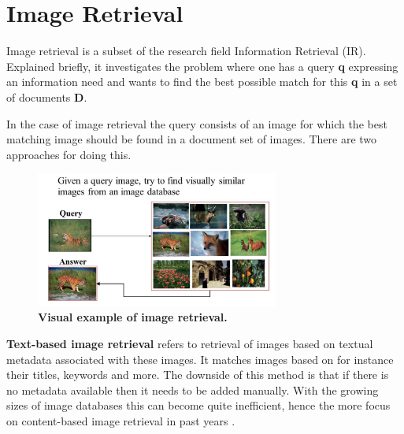 \documentclass{article}
\begin{document}
\cite{gauch2006finding} %
\cite{wang2008multimodal} %

\cite{herley2006argos} %
\cite{berrani2008non} %

\cite{benezeth2010unsupervised} %
\cite{ibrahim2011tv} %
\cite{abduraman2011unsupervised} %
\fi


\section{Image Retrieval} \label{section:imageretrieval}
Image retrieval is a subset of the research field Information Retrieval (IR). Explained briefly, it investigates the problem where one has a query \textbf{q} expressing an information need and wants to find the best possible match for this \textbf{q} in a set of documents \textbf{D}.

In the case of image retrieval the query consists of an image for which the best matching image should be found in a document set of images. There are two approaches for doing this.

\begin{figure}[H]
	\includegraphics[width=8cm]{images/imageretrieval.png}
	\centering
	\caption{\textbf{Visual example of image retrieval.}}
	\label{fig:imageretrieval}
\end{figure}

\textbf{Text-based image retrieval} refers to retrieval of images based on textual metadata associated with these images. It matches images based on for instance their titles, keywords and more. The downside of this method is that if there is no metadata available then it needs to be added manually. With the growing sizes of image databases this can become quite inefficient, hence the more focus on content-based image retrieval in past years \cite{rajam2013survey}.
\end{document}
